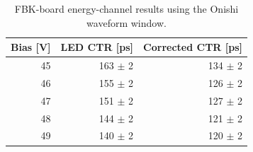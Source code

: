 \begin{table}[htbp]
\centering
\small
\begin{tabular}{rrr}
\toprule
Bias [V] & LED CTR [ps] & Corrected CTR [ps] \\
\midrule
45 & 163 $\pm$ 2 & 134 $\pm$ 2 \\
46 & 155 $\pm$ 2 & 126 $\pm$ 2 \\
47 & 151 $\pm$ 2 & 127 $\pm$ 2 \\
48 & 144 $\pm$ 2 & 121 $\pm$ 2 \\
49 & 140 $\pm$ 2 & 120 $\pm$ 2 \\
\bottomrule
\end{tabular}
\caption{FBK-board energy-channel results using the Onishi waveform window.}
\label{tab:fbk-energy-onishi}
\end{table}
